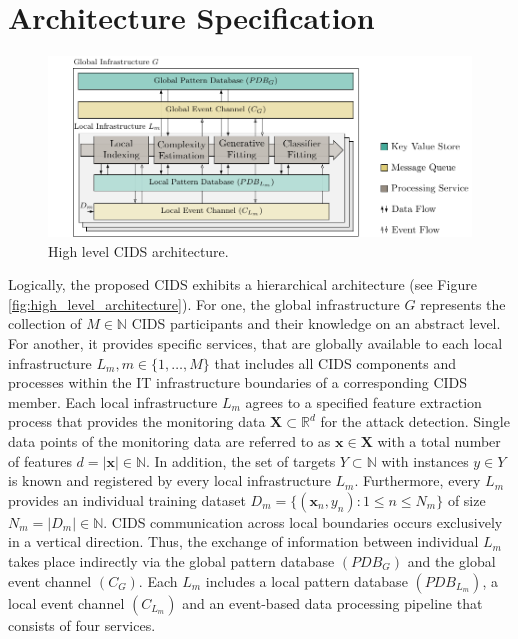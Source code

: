 \section{Architecture Specification} \label{sec:system_architecture}



\begin{figure}[b!]
    \centering
    \includegraphics[width=1\linewidth]{tikz/detailed_architecture.pdf}
    \caption{High level CIDS architecture.}
    \label{fig:detailed_architecture}
    \end{figure}

    
    Logically, the proposed CIDS exhibits a hierarchical architecture (see Figure \ref{fig:high_level_architecture}). For one, the global infrastructure $G$ represents the collection of $M \in \mathbb{N}$ CIDS participants and their knowledge on an abstract level. For another, it provides specific services, that are globally available to each local infrastructure $L_m, m \in \{1, \dots, M\}$ that includes all CIDS components and processes within the IT infrastructure boundaries of a corresponding CIDS member. Each local infrastructure $L_m$ agrees to a specified feature extraction process that provides the monitoring data $\bm{X} \subset \mathbb{R}^d$ for the attack detection. Single data points of the monitoring data are referred to as $\bm{x} \in \bm{X}$ with a total number of features $d = |\bm{x}| \in \mathbb{N}$. In addition, the set of targets $Y \subset \mathbb{N}$ with instances $y \in Y$ is known and registered by every local infrastructure $L_m$. Furthermore, every $L_m$ provides an individual training dataset $D_m= \{(\bm{x}_n, y_n): 1 \leq n \leq N_m\}$ of size $N_m = |D_m| \in \mathbb{N}$. CIDS communication across local boundaries occurs exclusively in a vertical direction. Thus, the exchange of information between individual $L_m$ takes place indirectly via the global pattern database $(PDB_G)$ and the global event channel $(C_G)$. Each $L_m$ includes a local pattern database $(PDB_{L_m})$, a local event channel $(C_{L_m})$ and an event-based data processing pipeline that consists of four services.

